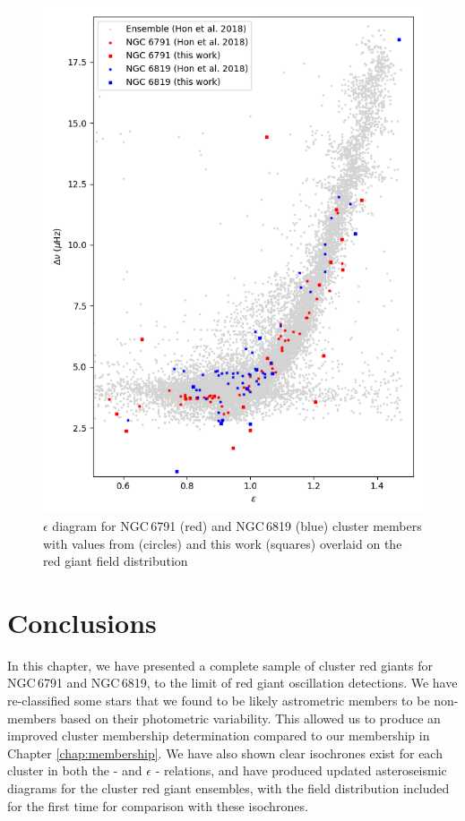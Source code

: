 \begin{figure}
    \centering
    \includegraphics[height=0.5\textheight]{Chapter5/epsilon_combined.png}
    \caption[$\epsilon$ \textendash \dnu{} diagram for NGC\, 6791 and NGC\, 6819 cluster members]{$\epsilon$ \textendash \dnu{} diagram for NGC\,6791 (red) and NGC\,6819 (blue) cluster members with values from \cite{hon_search_2019} (circles) and this work (squares) overlaid on the red giant field distribution}
    \label{fig:eps_6791}
\end{figure}

\section{Conclusions}

In this chapter, we have presented a complete sample of cluster red giants for NGC\,6791 and NGC\,6819, to the limit of red giant oscillation detections. We have re-classified some stars that we found to be likely astrometric members to be non-members based on their photometric variability. This allowed us to produce an improved cluster membership determination compared to our membership in Chapter \ref{chap:membership}. We have also shown clear isochrones exist for each cluster in both the \numax{} - \dnu{} and $\epsilon$ - \dnu{} relations, and have produced updated asteroseismic diagrams for the cluster red giant ensembles, with the field distribution included for the first time for comparison with these isochrones.



